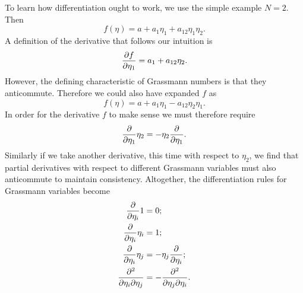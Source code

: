 To learn how differentiation ought to work, we use the simple example
$N=2$. Then
\begin{equation}
  f(\eta)=a+a_1\eta_1+a_{12}\eta_1\eta_2.
\end{equation}
A definition of the derivative that follows our intuition is
\begin{equation}
  \pdv{f}{\eta_1}=a_1+a_{12}\eta_2.
\end{equation}
However, the defining characteristic of Grassmann numbers is that they
anticommute. Therefore we could also have expanded $f$ as
\begin{equation}
  f(\eta)=a+a_1\eta_1-a_{12}\eta_2\eta_1.
\end{equation}
In order for the derivative $f$ to make sense we must therefore require
\begin{equation}
  \pdv{\eta_1}\eta_2=
  -\eta_2\pdv{\eta_1}.
\end{equation}
Similarly if we take another derivative, this time with respect to $\eta_2$,
we find that partial derivatives with respect to different Grassmann variables
must also anticommute to maintain consistency. Altogether, the differentiation
rules for Grassmann variables become
\begin{equation}\begin{aligned}
  \pdv{\eta_i}1&=0;\\
  \pdv{\eta_i}\eta_i&=1;\\
  \pdv{\eta_i}\eta_j&=
  -\eta_j\pdv{\eta_i};\\
  \frac{\partial^2}{\partial\eta_i\partial\eta_j}&=
  -\frac{\partial^2}{\partial\eta_j\partial\eta_i}.
\end{aligned}\end{equation}

